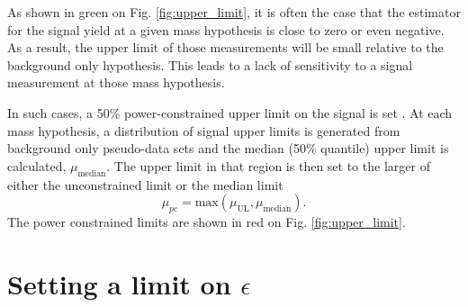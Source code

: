 As shown in green on Fig. \ref{fig:upper_limit}, it is often the case that the
estimator for the signal yield at a given mass hypothesis is close to zero or
even negative.  As a result, the upper limit of those measurements will be small
relative to the background only hypothesis. This leads to a lack of 
sensitivity to a signal measurement at those mass hypothesis.

In such cases, a 50\% power-constrained upper limit on the signal is set
\cite{Cowan:2011an}.
At each mass hypothesis, a distribution of signal upper limits is generated from
background only pseudo-data sets and the median (50\% quantile) upper limit
is calculated, $\mu_{\mbox{median}}$. The upper limit in that region is then set to 
the larger of either the unconstrained limit or the median limit
\begin{equation}
    \mu_{pc} = \mbox{max}(\mu_{\mbox{UL}}, \mu_{\mbox{median}}).
\end{equation}
The power constrained limits are shown in red on Fig. \ref{fig:upper_limit}.

\section{Setting a limit on $\epsilon$}

